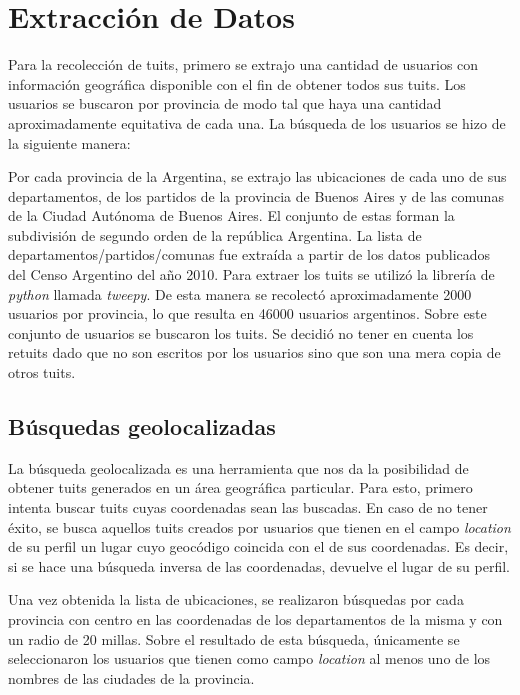 

\section{Extracción de Datos}

Para la recolección de tuits, primero se extrajo una cantidad de usuarios con información geográfica disponible con el fin de obtener todos sus tuits.
Los usuarios se buscaron por provincia de modo tal que haya una cantidad aproximadamente equitativa de cada una.
La búsqueda de los usuarios se hizo de la siguiente manera:

Por cada provincia de la Argentina, se extrajo las ubicaciones de cada uno de sus departamentos, de los partidos de la provincia de Buenos Aires y de las comunas de la Ciudad Autónoma de Buenos Aires. El conjunto de estas forman la subdivisión de segundo orden de la república Argentina. La lista de departamentos/partidos/comunas fue extraída a partir de los datos publicados del Censo Argentino del año 2010. Para extraer los tuits se utilizó la librería de \textit{python} llamada \textit{tweepy}.
De esta manera se recolectó aproximadamente 2000 usuarios por provincia, lo que resulta en 46000 usuarios argentinos. Sobre este conjunto de usuarios se buscaron los tuits. Se decidió no tener en cuenta los retuits dado que no son escritos por los usuarios sino que son una mera copia de otros tuits. 


\subsection{Búsquedas geolocalizadas}

La búsqueda geolocalizada es una herramienta que nos da la posibilidad de obtener tuits generados en un área geográfica particular. Para esto, primero intenta buscar tuits cuyas coordenadas sean las buscadas. En caso de no tener éxito, se busca aquellos tuits creados por usuarios que tienen en el campo \textit{location} de su perfil un lugar cuyo geocódigo coincida con el de sus coordenadas. Es decir, si se hace una búsqueda inversa de las coordenadas, devuelve el lugar de su perfil.

Una vez obtenida la lista de ubicaciones, se realizaron búsquedas por cada provincia con centro en las coordenadas de los departamentos de la misma y con un radio de 20 millas. Sobre el resultado de esta búsqueda, únicamente se seleccionaron los usuarios que tienen como campo \textit{location} al menos uno de los nombres de las ciudades de la provincia. 

